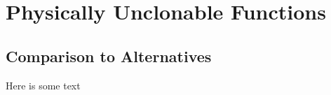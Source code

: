 
\chapter{Physically Unclonable Functions}
\label{chapter:pufoverview}

\section{Comparison to Alternatives}
Here is some text